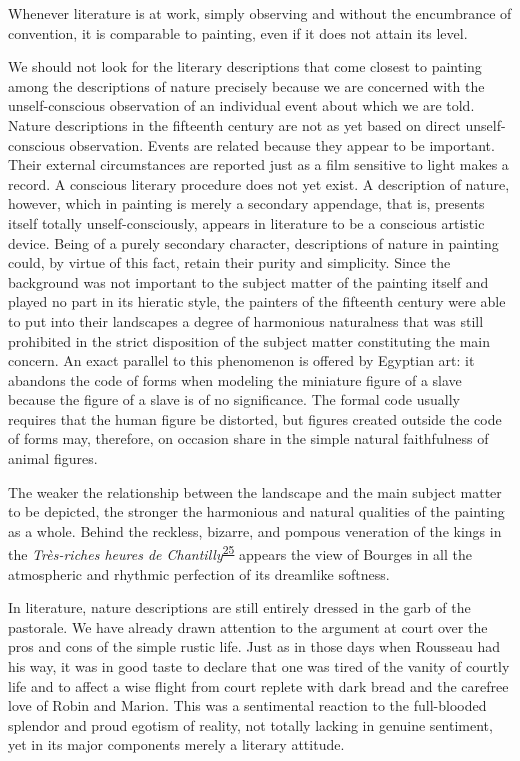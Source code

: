 Whenever literature is at work, simply observing and without the
encumbrance of convention, it is comparable to painting, even if it does
not attain its level.

We should not look for the literary descriptions that come closest
\protect\hypertarget{21_Chapter_Thirteen__IMAGE_AND_WORD.xhtmlux5cux23page_350}{}{}to
painting among the descriptions of nature precisely because we are
concerned with the unself-conscious observation of an individual event
about which we are told. Nature descriptions in the fifteenth century
are not as yet based on direct unself-conscious observation. Events are
related because they appear to be important. Their external
circumstances are reported just as a film sensitive to light makes a
record. A conscious literary procedure does not yet exist. A description
of nature, however, which in painting is merely a secondary appendage,
that is, presents itself totally unself-consciously, appears in
literature to be a conscious artistic device. Being of a purely
secondary character, descriptions of nature in painting could, by virtue
of this fact, retain their purity and simplicity. Since the background
was not important to the subject matter of the painting itself and
played no part in its hieratic style, the painters of the fifteenth
century were able to put into their landscapes a degree of harmonious
naturalness that was still prohibited in the strict disposition of the
subject matter constituting the main concern. An exact parallel to this
phenomenon is offered by Egyptian art: it abandons the code of forms
when modeling the miniature figure of a slave because the figure of a
slave is of no significance. The formal code usually requires that the
human figure be distorted, but figures created outside the code of forms
may, therefore, on occasion share in the simple natural faithfulness of
animal figures.

The weaker the relationship between the landscape and the main subject
matter to be depicted, the stronger the harmonious and natural qualities
of the painting as a whole. Behind the reckless, bizarre, and pompous
veneration of the kings in the \emph{Très-riches heures de
Chantilly}\textsuperscript{\protect\hypertarget{21_Chapter_Thirteen__IMAGE_AND_WORD.xhtmlux5cux23id_260}{\protect\hyperlink{23_NOTES.xhtmlux5cux23id_261}{25}}}
appears the view of Bourges in all the atmospheric and rhythmic
perfection of its dreamlike softness.

In literature, nature descriptions are still entirely dressed in the
garb of the pastorale. We have already drawn attention to the argument
at court over the pros and cons of the simple rustic life. Just as in
those days when Rousseau had his way, it was in good taste to declare
that one was tired of the vanity of courtly life and to affect a wise
flight from court replete with dark bread and the carefree love of Robin
and Marion. This was a sentimental reaction to the full-blooded splendor
and proud egotism of reality, not totally lacking in genuine sentiment,
yet in its major components merely a literary attitude.

